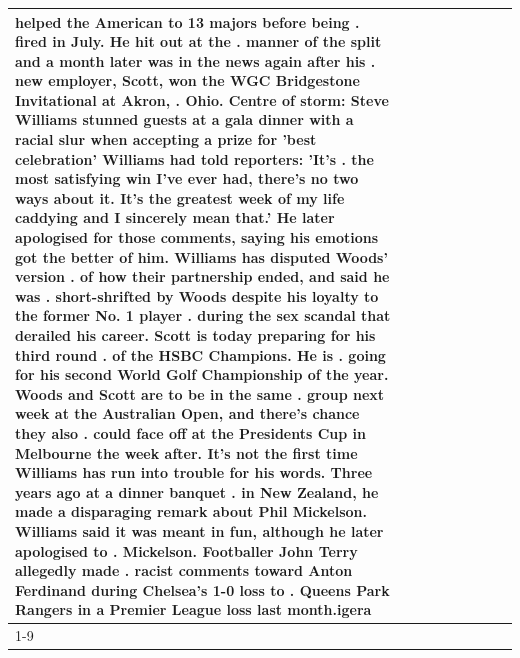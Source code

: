 \begin{table}[H]
\begin{tabular}{lllrlllll}
helped the American to 13 majors before being . fired in July. He hit out at the . manner of the split and a month later was in the news again after his . new employer, Scott, won the WGC Bridgestone Invitational at Akron, . Ohio. Centre of storm: Steve Williams stunned guests at a gala dinner with a racial slur when accepting a prize for 'best celebration' Williams had told reporters: 'It's . the most satisfying win I've ever had, there's no two ways about it. It's the greatest week of my life caddying and I sincerely mean that.' He later apologised for those comments, saying his emotions got the better of him. Williams has disputed Woods' version . of how their partnership ended, and said he was . short-shrifted by Woods despite his loyalty to the former No. 1 player . during the sex scandal that derailed his career. Scott is today preparing for his third round . of the HSBC Champions. He is . going for his second World Golf Championship of the year. Woods and Scott are to be in the same . group next week at the Australian Open, and there's chance they also . could face off at the Presidents Cup in Melbourne the week after. It's not the first time Williams has run into trouble for his words. Three years ago at a dinner banquet . in New Zealand, he made a disparaging remark about Phil Mickelson. Williams said it was meant in fun, although he later apologised to . Mickelson. Footballer John Terry allegedly made . racist comments toward Anton Ferdinand during Chelsea's 1-0 loss to . Queens Park Rangers in a Premier League loss last month.igera \\
\cline{1-9}

\end{tabular}
\end{table}
